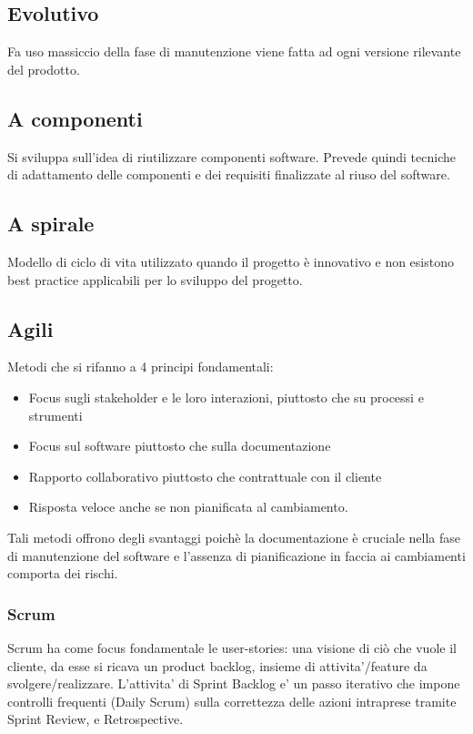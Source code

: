 		\subsection{Evolutivo}
			Fa uso massiccio della fase di manutenzione viene fatta ad ogni versione rilevante del prodotto.
		
		\subsection{A componenti}
			Si sviluppa sull'idea di riutilizzare componenti software. Prevede quindi tecniche di adattamento delle componenti e dei requisiti finalizzate al riuso del software.
		
		\subsection{A spirale}	
				Modello di ciclo di vita utilizzato quando il progetto è innovativo e non esistono best practice applicabili per lo sviluppo del progetto.
		
		\subsection{Agili}
		Metodi che si rifanno a 4 principi fondamentali:
			\begin{itemize}  
			\item Focus sugli stakeholder e le loro interazioni, piuttosto che su processi e strumenti
			\item Focus sul software piuttosto che sulla documentazione
			\item Rapporto collaborativo piuttosto che contrattuale con il cliente
			\item Risposta veloce anche se non pianificata al cambiamento. 
			\end{itemize}				
		Tali metodi offrono degli svantaggi poichè la documentazione è cruciale nella fase di manutenzione del software e l'assenza di pianificazione in faccia ai cambiamenti comporta dei rischi.
		
			\subsubsection{Scrum}
				Scrum ha come focus fondamentale le  user-stories: una visione di ciò che vuole il cliente, da esse si ricava un product backlog, insieme di attivita'/feature da svolgere/realizzare. L'attivita' di Sprint Backlog e' un passo iterativo che impone controlli frequenti (Daily Scrum) sulla correttezza delle azioni intraprese tramite Sprint Review, e Retrospective.\newpage

